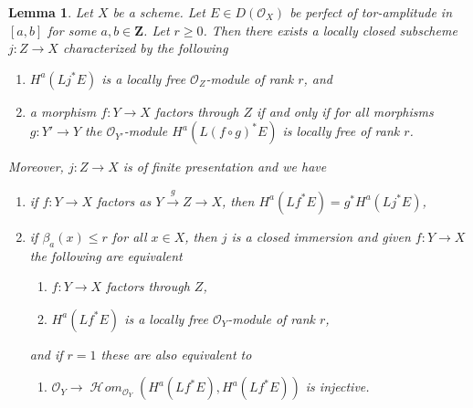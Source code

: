 \documentclass{stacks-project}
\theoremstyle{plain}
\newtheorem{lemma}[subsection]{Lemma}
\theoremstyle{definition}
\theoremstyle{remark}
\numberwithin{equation}{subsection}
\def\SheafHom{\mathop{\mathcal{H}\!\mathit{om}}\nolimits}
\begin{document}
\begin{lemma}
\label{lemma-locally-closed-where-H0-locally-free}
Let $X$ be a scheme. Let $E \in D(\mathcal{O}_X)$ be perfect
of tor-amplitude in $[a, b]$ for some $a, b \in \mathbf{Z}$.
Let $r \geq 0$.
Then there exists a locally closed subscheme $j : Z \to X$
characterized by the following
\begin{enumerate}
\item $H^a(Lj^*E)$ is a locally free $\mathcal{O}_Z$-module of rank $r$, and
\item a morphism $f : Y \to X$ factors through $Z$
if and only if for all morphisms $g : Y' \to Y$ the
$\mathcal{O}_{Y'}$-module $H^a(L(f \circ g)^*E)$ is locally free
of rank $r$.
\end{enumerate}
Moreover, $j : Z \to X$ is of finite presentation and we have
\begin{enumerate}
\item[(3)] if $f : Y \to X$ factors as $Y \xrightarrow{g} Z \to X$, then
$H^a(Lf^*E) = g^*H^a(Lj^*E)$,
\item[(4)] if $\beta_a(x) \leq r$ for all $x \in X$, then
$j$ is a closed immersion and given $f : Y \to X$ the following
are equivalent
\begin{enumerate}
\item $f : Y \to X$ factors through $Z$,
\item $H^a(Lf^*E)$ is a locally free $\mathcal{O}_Y$-module of rank $r$,
\end{enumerate}
and if $r = 1$ these are also equivalent to
\begin{enumerate}
\item[(c)] $\mathcal{O}_Y \to \SheafHom_{\mathcal{O}_Y}(H^a(Lf^*E), H^a(Lf^*E))$
is injective.
\end{enumerate}
\end{enumerate}
\end{lemma}
\end{document}
